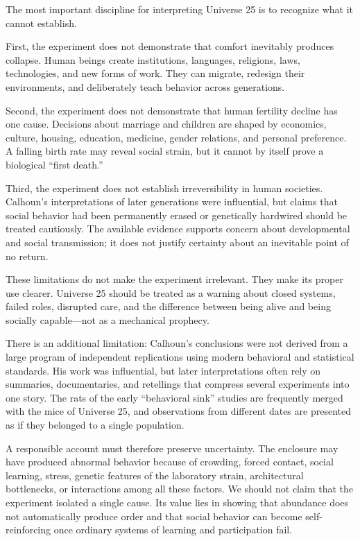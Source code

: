 ﻿\documentclass[12pt,a4paper]{book}
\begin{document}
The most important discipline for interpreting Universe 25 is to recognize what it cannot establish.

First, the experiment does not demonstrate that comfort inevitably produces collapse. Human beings create institutions, languages, religions, laws, technologies, and new forms of work. They can migrate, redesign their environments, and deliberately teach behavior across generations.

Second, the experiment does not demonstrate that human fertility decline has one cause. Decisions about marriage and children are shaped by economics, culture, housing, education, medicine, gender relations, and personal preference. A falling birth rate may reveal social strain, but it cannot by itself prove a biological ``first death.''

Third, the experiment does not establish irreversibility in human societies. Calhoun's interpretations of later generations were influential, but claims that social behavior had been permanently erased or genetically hardwired should be treated cautiously. The available evidence supports concern about developmental and social transmission; it does not justify certainty about an inevitable point of no return.

These limitations do not make the experiment irrelevant. They make its proper use clearer. Universe 25 should be treated as a warning about closed systems, failed roles, disrupted care, and the difference between being alive and being socially capable---not as a mechanical prophecy.

There is an additional limitation: Calhoun's conclusions were not derived from a large program of independent replications using modern behavioral and statistical standards. His work was influential, but later interpretations often rely on summaries, documentaries, and retellings that compress several experiments into one story. The rats of the early ``behavioral sink'' studies are frequently merged with the mice of Universe 25, and observations from different dates are presented as if they belonged to a single population.

A responsible account must therefore preserve uncertainty. The enclosure may have produced abnormal behavior because of crowding, forced contact, social learning, stress, genetic features of the laboratory strain, architectural bottlenecks, or interactions among all these factors. We should not claim that the experiment isolated a single cause. Its value lies in showing that abundance does not automatically produce order and that social behavior can become self-reinforcing once ordinary systems of learning and participation fail.
\end{document}
